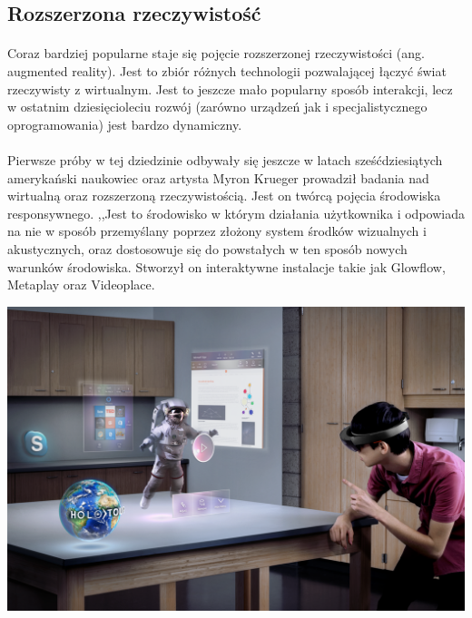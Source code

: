 \subsection{Rozszerzona rzeczywistość}
\paragraph{}
Coraz bardziej popularne staje się pojęcie rozszerzonej rzeczywistości (ang. augmented reality). Jest to zbiór różnych technologii pozwalającej łączyć świat rzeczywisty z wirtualnym. Jest to jeszcze mało popularny sposób interakcji, lecz w ostatnim dziesięcioleciu rozwój (zarówno urządzeń jak i specjalistycznego oprogramowania) jest bardzo dynamiczny.
\paragraph{}
Pierwsze próby w tej dziedzinie odbywały się jeszcze w latach sześćdziesiątych amerykański naukowiec oraz artysta Myron Krueger prowadził badania nad wirtualną oraz rozszerzoną rzeczywistością. Jest on twórcą pojęcia środowiska responsywnego. ,,Jest to środowisko w którym działania użytkownika i odpowiada na nie w sposób przemyślany poprzez złożony system środków wizualnych i akustycznych, oraz dostosowuje się do powstałych w ten sposób nowych warunków środowiska\cite{kr}. Stworzył on interaktywne instalacje takie jak Glowflow\cite{glow}, Metaplay\cite{metaplay} oraz Videoplace\cite{videoplace}.

\begin{center}
\includegraphics[width=1\textwidth]{images/hololens.png}
\end{center}
